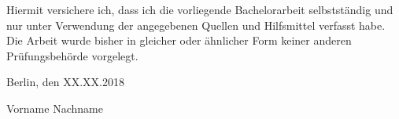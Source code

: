 
Hiermit versichere ich, dass ich die vorliegende Bachelorarbeit selbstständig und nur unter Verwendung der angegebenen Quellen und Hilfsmittel verfasst habe. Die Arbeit wurde bisher in gleicher oder ähnlicher Form keiner anderen Prüfungsbehörde vorgelegt.

\vskip 1cm

Berlin, den XX.XX.2018

\vskip 1.5cm

Vorname Nachname
